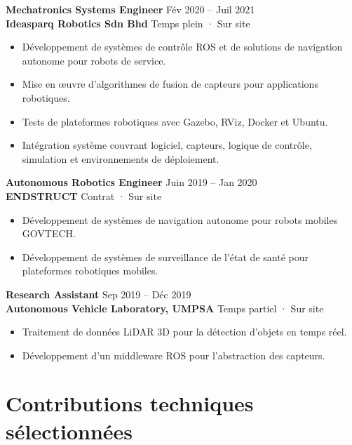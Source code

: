 \documentclass[11pt,a4paper]{article}
\begin{document}
\textbf{\color{PrimaryColor}Mechatronics Systems Engineer} \hfill Fév 2020 -- Juil 2021\\
\textbf{Ideasparq Robotics Sdn Bhd} \hfill Temps plein · Sur site

\begin{itemize}
    \item Développement de systèmes de contrôle ROS et de solutions de navigation autonome pour robots de service.
    \item Mise en œuvre d'algorithmes de fusion de capteurs pour applications robotiques.
    \item Tests de plateformes robotiques avec Gazebo, RViz, Docker et Ubuntu.
    \item Intégration système couvrant logiciel, capteurs, logique de contrôle, simulation et environnements de déploiement.
\end{itemize}

\textbf{\color{PrimaryColor}Autonomous Robotics Engineer} \hfill Juin 2019 -- Jan 2020\\
\textbf{ENDSTRUCT} \hfill Contrat · Sur site

\begin{itemize}
    \item Développement de systèmes de navigation autonome pour robots mobiles GOVTECH.
    \item Développement de systèmes de surveillance de l'état de santé pour plateformes robotiques mobiles.
\end{itemize}

\textbf{\color{PrimaryColor}Research Assistant} \hfill Sep 2019 -- Déc 2019\\
\textbf{Autonomous Vehicle Laboratory, UMPSA} \hfill Temps partiel · Sur site

\begin{itemize}
    \item Traitement de données LiDAR 3D pour la détection d'objets en temps réel.
    \item Développement d'un middleware ROS pour l'abstraction des capteurs.
\end{itemize}

\section*{Contributions techniques sélectionnées}
\end{document}

